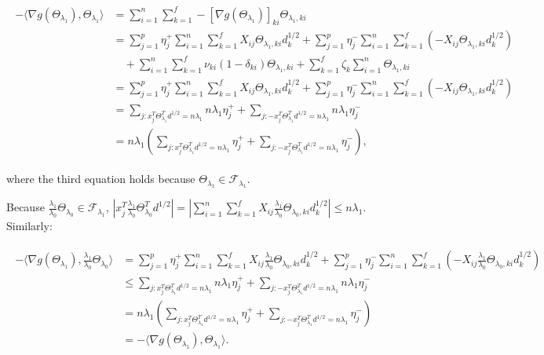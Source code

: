 \begin{gather}
    \label{eq:thm2.5}
    \begin{aligned}
        -\langle\nabla g(\Theta_{\lambda_1}),\Theta_{\lambda_1}\rangle&=\sum_{i=1}^n\sum_{k=1}^f-[\nabla g(\Theta_{\lambda_1})]_{ki}\Theta_{\lambda_1,ki}\\
        &=\sum_{j=1}^p\eta^+_j\sum_{i=1}^n\sum_{k=1}^fX_{ij}\Theta_{\lambda_1,ki}d_k^{1/2}+\sum_{j=1}^p\eta^-_j\sum_{i=1}^n\sum_{k=1}^f(-X_{ij}\Theta_{\lambda_1,ki}d_k^{1/2})\\&\quad+\sum_{i=1}^n\sum_{k=1}^f\nu_{ki}(1-\delta_{ki})\Theta_{\lambda_1,ki}+\sum_{k=1}^f\zeta_{k}\sum_{i=1}^n\Theta_{\lambda_1,ki}\\
        &=\sum_{j=1}^p\eta^+_j\sum_{i=1}^n\sum_{k=1}^fX_{ij}\Theta_{\lambda_1,ki}d_k^{1/2}+\sum_{j=1}^p\eta^-_j\sum_{i=1}^n\sum_{k=1}^f(-X_{ij}\Theta_{\lambda_1,ki}d_k^{1/2})\\
        &=\sum_{j:x_j^T\Theta_{\lambda_1}^Td^{1/2}=n\lambda_1}n\lambda_1\eta_j^++\sum_{j:-x_j^T\Theta_{\lambda_1}^Td^{1/2}=n\lambda_1}n\lambda_1\eta_j^-\\
        &=n\lambda_1\left(\sum_{j:x_j^T\Theta_{\lambda_1}^Td^{1/2}=n\lambda_1}\eta_j^++\sum_{j:-x_j^T\Theta_{\lambda_1}^Td^{1/2}=n\lambda_1}\eta_j^-\right),
    \end{aligned}
\end{gather}

where the third equation holds because $\Theta_{\lambda_1}\in\mathcal{F}_{\lambda_1}$.

Because $\frac{\lambda_1}{\lambda_0}\Theta_{\lambda_0}\in \mathcal{F}_{\lambda_1}$, $\left|x_j^T\frac{\lambda_1}{\lambda_0}\Theta_{\lambda_0}^Td^{1/2}\right|=\left|\sum_{i=1}^n\sum_{k=1}^fX_{ij}\frac{\lambda_1}{\lambda_0}\Theta_{\lambda_0,ki}d_k^{1/2}\right|\leq n\lambda_1$. Similarly:

\begin{gather}
    \label{eq:thm2.6}
    \begin{aligned}
        -\langle\nabla g(\Theta_{\lambda_1}),\frac{\lambda_1}{\lambda_0}\Theta_{\lambda_0}\rangle
        &=\sum_{j=1}^p\eta^+_j\sum_{i=1}^n\sum_{k=1}^fX_{ij}\frac{\lambda_1}{\lambda_0}\Theta_{\lambda_0,ki}d_k^{1/2}+\sum_{j=1}^p\eta^-_j\sum_{i=1}^n\sum_{k=1}^f(-X_{ij}\frac{\lambda_1}{\lambda_0}\Theta_{\lambda_0,ki}d_k^{1/2})\\
        &\leq\sum_{j:x_j^T\Theta_{\lambda_1}^Td^{1/2}=n\lambda_1}n\lambda_1\eta_j^++\sum_{j:-x_j^T\Theta_{\lambda_1}^Td^{1/2}=n\lambda_1}n\lambda_1\eta_j^-\\
        &=n\lambda_1\left(\sum_{j:x_j^T\Theta_{\lambda_1}^Td^{1/2}=n\lambda_1}\eta_j^++\sum_{j:-x_j^T\Theta_{\lambda_1}^Td^{1/2}=n\lambda_1}\eta_j^-\right)\\
        &=-\langle\nabla g(\Theta_{\lambda_1}),\Theta_{\lambda_1}\rangle.
    \end{aligned}
\end{gather}

